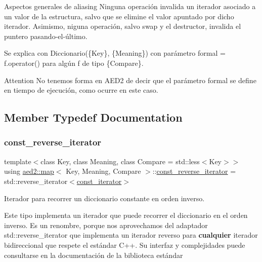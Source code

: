 \begin{DoxyParagraph}{Aspectos generales de aliasing}
Ninguna operación invalida un iterador asociado a un valor de la estructura, salvo que se elimine el valor apuntado por dicho iterador. Asimismo, niguna operación, salvo swap y el destructor, invalida el puntero pasando-\/el-\/último.
\end{DoxyParagraph}
\begin{DoxyParagraph}{Se explica con}
Diccionario(\{Key\}, \{Meaning\}) con parámetro formal  = f.\+operator() para algún f de tipo \{Compare\}.
\end{DoxyParagraph}
\begin{DoxyAttention}{Attention}
No tenemos forma en A\+E\+D2 de decir que el parámetro formal se define en tiempo de ejecución, como ocurre en este caso. 
\end{DoxyAttention}


\subsection{Member Typedef Documentation}
\mbox{\label{classaed2_1_1map_aed66a216549d13078a3ea6978ea0b768}} 
\subsubsection{\texorpdfstring{const\+\_\+reverse\+\_\+iterator}{const\_reverse\_iterator}\hspace{0.1cm}{\footnotesize\ttfamily [1/2]}}
{\footnotesize\ttfamily template$<$class Key, class Meaning, class Compare = std\+::less$<$\+Key$>$$>$ \\
using \hyperlink{classaed2_1_1map}{aed2\+::map}$<$ Key, Meaning, Compare $>$\+::\hyperlink{classaed2_1_1map_aed66a216549d13078a3ea6978ea0b768}{const\+\_\+reverse\+\_\+iterator} =  std\+::reverse\+\_\+iterator$<$\hyperlink{classaed2_1_1map_1_1const__iterator}{const\+\_\+iterator}$>$}



Iterador para recorrer un diccionario constante en orden inverso. 

Este tipo implementa un iterador que puede recorrer el diccionario en el orden inverso. Es un renombre, porque nos aprovechamos del adaptador {\ttfamily std\+::reverse\+\_\+iterator} que implementa un iterador reverso para {\bfseries cualquier} iterador bidireccional que respete el estándar C++. Su interfaz y complejidades puede consultarse en la documentación de la biblioteca estándar

